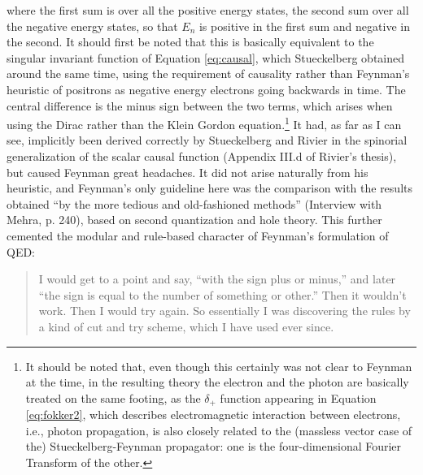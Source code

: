 \documentclass[12pt,a4paper]{article}
\begin{document}
where the first sum is over all the positive energy states, the second sum over all the negative energy states, so that $E_n$ is positive in the first sum and negative in the second. It should first be noted that this is basically equivalent to the singular invariant function of Equation \ref{eq:causal}, which Stueckelberg obtained around the same time, using the requirement of causality rather than Feynman's heuristic of positrons as negative energy electrons going backwards in time. The central difference is the minus sign between the two terms, which arises when using the Dirac rather than the Klein Gordon equation.\footnote{It should be noted that, even though this certainly was not clear to Feynman at the time, in the resulting theory the electron and the photon are basically treated on the same footing, as the $\delta_+$ function appearing in Equation \ref{eq:fokker2}, which describes electromagnetic interaction between electrons, i.e., photon propagation, is also closely related to the (massless vector case of the) Stueckelberg-Feynman propagator: one is the four-dimensional Fourier Transform of the other.}  It had, as far as I can see, implicitly been derived correctly by Stueckelberg and Rivier in the spinorial generalization of the scalar causal function (Appendix III.d of Rivier's thesis), but caused Feynman great headaches. It did not arise naturally from his heuristic, and Feynman's only guideline here was the comparison with the results obtained ``by the more tedious and old-fashioned methods'' (Interview with Mehra, p. 240), based on second quantization and hole theory. This further cemented the modular and rule-based character of Feynman's formulation of QED:

\begin{quote}
I would get to a point and say, ``with the sign plus or minus,'' and later ``the sign is equal to the number of something or other.'' Then it wouldn't work. Then I would try again. So essentially I was discovering the rules by a kind of cut and try scheme, which I have used ever since.
\end{quote}
\end{document}
